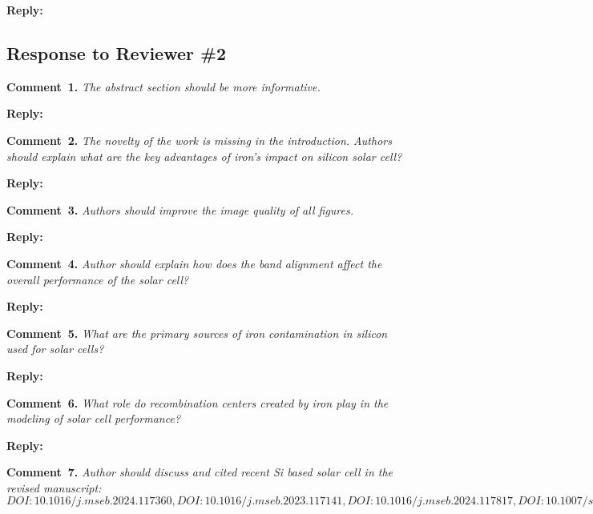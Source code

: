 \documentclass[a4paper,fleqn]{cas-sc}
\begin{document}
\noindent
\textcolor[rgb]{0.51,0.00,0.00}{\textbf{Reply:}}





\subsection*{Response to Reviewer \#2 }

\noindent
\textcolor[rgb]{0.00,0.50,1.00}{\textbf{Comment~1.}}
\emph{The abstract section should be more informative.}

\noindent
\textcolor[rgb]{0.51,0.00,0.00}{\textbf{Reply:}}




\noindent
\textcolor[rgb]{0.00,0.50,1.00}{\textbf{Comment~2.}}
\emph{The novelty of the work is missing in the introduction. Authors should explain what are the key advantages of iron's impact on silicon solar cell?}

\noindent
\textcolor[rgb]{0.51,0.00,0.00}{\textbf{Reply:}}




\noindent
\textcolor[rgb]{0.00,0.50,1.00}{\textbf{Comment~3.}}
\emph{Authors should improve the image quality of all figures.}

\noindent
\textcolor[rgb]{0.51,0.00,0.00}{\textbf{Reply:}}




\noindent
\textcolor[rgb]{0.00,0.50,1.00}{\textbf{Comment~4.}}
\emph{Author should explain how does the band alignment affect the overall performance of the solar cell?}

\noindent
\textcolor[rgb]{0.51,0.00,0.00}{\textbf{Reply:}}




\noindent
\textcolor[rgb]{0.00,0.50,1.00}{\textbf{Comment~5.}}
\emph{What are the primary sources of iron contamination in silicon used for solar cells?}

\noindent
\textcolor[rgb]{0.51,0.00,0.00}{\textbf{Reply:}}




\noindent
\textcolor[rgb]{0.00,0.50,1.00}{\textbf{Comment~6.}}
\emph{What role do recombination centers created by iron play in the modeling of solar cell performance?}

\noindent
\textcolor[rgb]{0.51,0.00,0.00}{\textbf{Reply:}}




\noindent
\textcolor[rgb]{0.00,0.50,1.00}{\textbf{Comment~7.}}
\emph{Author should discuss and cited recent Si based solar cell in the revised manuscript: $DOI:10.1016/j.mseb.2024.117360, DOI:10.1016/j.mseb.2023.117141, DOI:10.1016/j.mseb.2024.117817, DOI:10.1007/s42247-024-00821-y, DOI:10.1016/j.inoche.2024.112785$}
\end{document}
